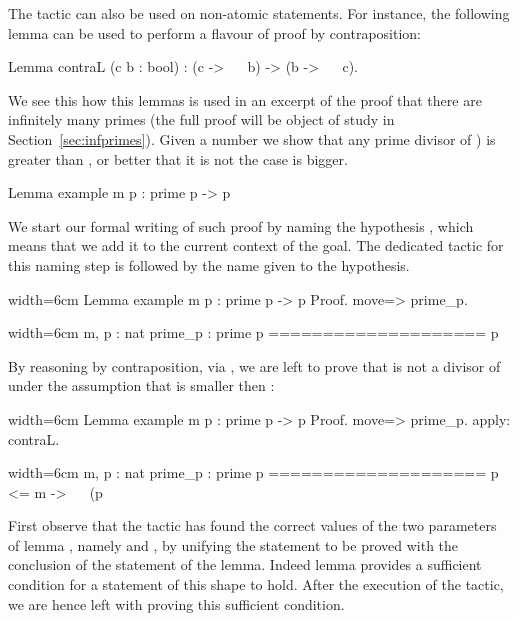 The  tactic can also be used on non-atomic statements. For
instance, the following lemma can be used to perform a flavour of
proof by contraposition:

\begin{coq}{}{}
Lemma contraL (c b : bool) : (c -> ~~ b) -> (b -> ~~ c).
\end{coq}

We see this how this lemmas is used in an excerpt of the proof
that there are infinitely many primes (the full proof will be
object of study in Section~\ref{sec:infprimes}).  Given a number 
we show that any prime divisor  of ) is greater than ,
or better that it is not the case  is bigger.

\begin{coq}{}{}
Lemma example m p : prime p -> p %
\end{coq}
We start our formal writing of such
proof by naming the hypothesis , which means that we add it to the
current context of the goal. The dedicated tactic for this naming step is
 followed by the name given to the hypothesis.

\begin{coq}{}{width=6cm}
Lemma example m p : prime p ->
  p %
Proof.
move=> prime_p.
\end{coq}
\begin{coqout}{}{width=6cm}
m, p : nat
prime_p : prime p
====================
p %
\end{coqout}

By reasoning by contraposition, via , we are left to
prove that  is not a divisor of  under the assumption
that  is smaller then :

\begin{coq}{}{width=6cm}
Lemma example m p : prime p ->
  p %
Proof.
move=> prime_p.
apply: contraL.
\end{coq}
\begin{coqout}{}{width=6cm}
m, p : nat
prime_p : prime p
====================
 p <= m -> ~~ (p %
\end{coqout}

First observe that the  tactic has found the correct values
of the two parameters  of lemma , namely
 and , by unifying the statement to be
proved with the conclusion  of the statement of the lemma.
Indeed lemma  provides a sufficient condition for a
statement of this shape to hold. After the execution of the tactic, we
are hence left with proving this sufficient condition.

